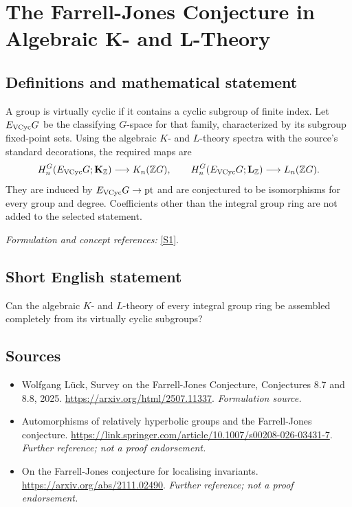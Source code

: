 \documentclass[11pt]{article}
\begin{document}
\section*{\texorpdfstring{The Farrell-Jones Conjecture in Algebraic K- and L-Theory}{The Farrell-Jones Conjecture in Algebraic K- and L-Theory}}\label{68}
\subsection{Definitions and mathematical statement}
A group is virtually cyclic if it contains a cyclic subgroup of finite index. Let $E_{\rm VCyc}G$ be the classifying $G$-space for that family, characterized by its subgroup fixed-point sets. Using the algebraic $K$- and $L$-theory spectra with the source's standard decorations, the required maps are
\[
 H_n^G(E_{\rm VCyc}G;\mathbf K_{{\mathbb{Z}}})\longrightarrow K_n({\mathbb{Z}} G),\qquad
 H_n^G(E_{\rm VCyc}G;\mathbf L_{{\mathbb{Z}}})\longrightarrow L_n({\mathbb{Z}} G).
\]
They are induced by $E_{\rm VCyc}G\to\mathrm{pt}$ and are conjectured to be isomorphisms for every group and degree. Coefficients other than the integral group ring are not added to the selected statement.
\par\smallskip\textit{Formulation and concept references:} \href{https://arxiv.org/html/2507.11337}{[S1]}.

\subsection{Short English statement}
Can the algebraic $K$- and $L$-theory of every integral group ring be assembled completely from its virtually cyclic subgroups?
\subsection{Sources}
\begin{itemize}
\item[S1]Wolfgang Lück, Survey on the Farrell-Jones Conjecture, Conjectures 8.7 and 8.8, 2025.
\url{https://arxiv.org/html/2507.11337}.
\textit{Formulation source.}
\item[S2]Automorphisms of relatively hyperbolic groups and the Farrell-Jones conjecture.
\url{https://link.springer.com/article/10.1007/s00208-026-03431-7}.
\textit{Further reference; not a proof endorsement.}
\item[S3]On the Farrell-Jones conjecture for localising invariants.
\url{https://arxiv.org/abs/2111.02490}.
\textit{Further reference; not a proof endorsement.}
\end{itemize}
\end{document}
